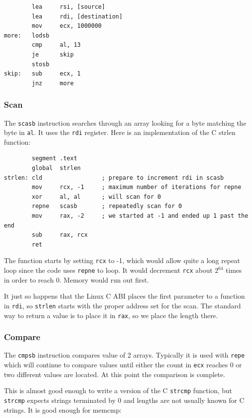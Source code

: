 \documentclass[11pt,b5paper]{book}
\begin{document}
\begin{verbatim}
        lea     rsi, [source]
        lea     rdi, [destination]
        mov     ecx, 1000000
more:   lodsb
        cmp     al, 13
        je      skip
        stosb
skip:   sub     ecx, 1
        jnz     more
\end{verbatim}

\subsubsection{Scan}

The {\tt scasb} instruction searches through an array looking for a byte matching the byte in {\tt al}. 
It uses the {\tt rdi} register.
Here is an implementation of the C strlen function:
\begin{verbatim}
        segment .text
        global  strlen
strlen: cld                 ; prepare to increment rdi in scasb
        mov     rcx, -1     ; maximum number of iterations for repne
        xor     al, al      ; will scan for 0
        repne   scasb       ; repeatedly scan for 0
        mov     rax, -2     ; we started at -1 and ended up 1 past the end
        sub     rax, rcx   
        ret
\end{verbatim}

The function starts by setting {\tt rcx} to -1, which would allow quite a long repeat loop since the code
uses {\tt repne} to loop.
It would decrement {\tt rcx} about $2^{64}$ times in order to reach 0.
Memory would run out first.

It just so happens that the Linux C ABI places the first parameter to a function in {\tt rdi}, so
{\tt strlen} starts with the proper address set for the scan.
The standard way to return a value is to place it in {\tt rax}, so we place the length there.


\subsubsection{Compare}

The {\tt cmpsb} instruction compares value of 2 arrays. 
Typically it is used with {\tt repe} which will continue to compare values until either the count in
{\tt ecx} reaches 0 or two different values are located.
At this point the comparison is complete.

This is almost good enough to write a version of the C {\tt strcmp} function, but {\tt strcmp} expects
strings terminated by 0 and lengths are not usually known for C strings.
It is good enough for memcmp:
\end{document}

